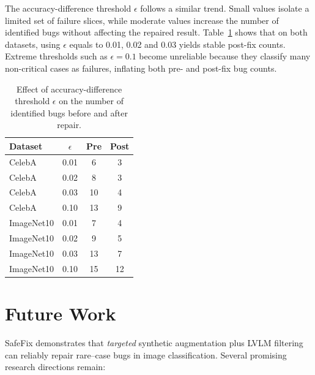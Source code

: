 \documentclass[10pt]{article} %
\newcommand{\model}{SafeFix\xspace}
\begin{document}
The accuracy-difference threshold $\epsilon$ follows a similar trend. Small values isolate a limited set of failure slices, while moderate values increase the number of identified bugs without affecting the repaired result. Table~\ref{tab:epsilon_threshold} shows that on both datasets, using \(\epsilon\) equals to 0.01, 0.02 and 0.03 yields stable post-fix counts. Extreme thresholds such as $\epsilon=0.1$ become unreliable because they classify many non-critical cases as failures, inflating both pre- and post-fix bug counts.

\begin{table}[!t]
\centering
\small
\setlength{\tabcolsep}{6pt}
\renewcommand{\arraystretch}{0.95}
\caption{Effect of accuracy-difference threshold $\epsilon$ on the number of identified bugs before and after repair.}
\label{tab:epsilon_threshold}
\begin{tabular}{lccc}
\toprule
\textbf{Dataset} & \boldmath$\epsilon$ & \textbf{Pre} & \textbf{Post} \\
\midrule
CelebA      & 0.01 & 6  & 3 \\
CelebA      & 0.02 & 8  & 3 \\
CelebA      & 0.03 & 10 & 4 \\
CelebA      & 0.10 & 13 & 9 \\
ImageNet10  & 0.01 & 7  & 4 \\
ImageNet10  & 0.02 & 9  & 5 \\
ImageNet10  & 0.03 & 13 & 7 \\
ImageNet10  & 0.10 & 15 & 12 \\
\bottomrule
\end{tabular}
\end{table}


\section{Future Work}
\label{sec:future_work}

\model{} demonstrates that \emph{targeted} synthetic augmentation plus LVLM
filtering can reliably repair rare–case bugs in image classification.  
Several promising research directions remain:
\end{document}

